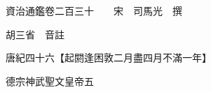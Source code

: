 










 


 
 


 

  
  
  
  
  





  
  
  
  
  
 
  

  

  
  
  



  

 
 

  
   




  

  
  


  　　資治通鑑卷二百三十　　宋　司馬光　撰

　　胡三省　音註

　　唐紀四十六【起閼逢困敦二月盡四月不滿一年】

　　德宗神武聖文皇帝五

